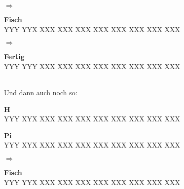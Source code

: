 $\Longrightarrow$
\parbox{0.2\linewidth}{
\begin{center}
  \textbf{Fisch} \\[1ex]
  \RubikCubeGreyAll%
	      {Y}{Y}{Y}
	      {Y}{Y}{X}%
		 {X}{X}{X}
		 {X}{X}{X}%
		 {X}{X}{X}
		 {X}{X}{X}%
		{X}{X}{X}
		{X}{X}{X}%
		{X}{X}{X}
		{X}{X}{X}%
\end{center}
}
$\Longrightarrow$
\parbox{0.2\linewidth}{
\begin{center}
  \textbf{Fertig} \\[1ex]
  \RubikCubeGreyAll%
	      {Y}{Y}{Y}
	      {Y}{Y}{Y}%
		 {X}{X}{X}
		 {X}{X}{X}%
		 {X}{X}{X}
		 {X}{X}{X}%
		{X}{X}{X}
		{X}{X}{X}%
		{X}{X}{X}
		{X}{X}{X}%
\end{center}
}\\[3em]
Und dann auch noch so:\\[1em]
\parbox{0.2\linewidth}{
  \begin{center}
    \textbf{H} \\[1ex]
    \RubikCubeGreyAll%
		{Y}{Y}{Y}
		{X}{Y}{X}%
		   {X}{X}{X}
		   {X}{X}{X}%
		   {X}{X}{X}
		   {X}{X}{X}%
		  {X}{X}{X}
		  {X}{X}{X}%
		  {X}{X}{X}
		  {X}{X}{X}%
  \end{center}
  \begin{center}
    \textbf{Pi} \\[1ex]
    \RubikCubeGreyAll%
		{Y}{Y}{Y}
		{X}{Y}{X}%
		   {X}{X}{X}
		   {X}{X}{X}%
		   {X}{X}{X}
		   {X}{X}{X}%
		  {X}{X}{X}
		  {X}{X}{X}%
		  {X}{X}{X}
		  {X}{X}{X}%
  \end{center}
}
$\Longrightarrow$
\parbox{0.2\linewidth}{
\begin{center}
  \textbf{Fisch} \\[1ex]
  \RubikCubeGreyAll%
	      {Y}{Y}{Y}
	      {Y}{Y}{X}%
		 {X}{X}{X}
		 {X}{X}{X}%
		 {X}{X}{X}
		 {X}{X}{X}%
		{X}{X}{X}
		{X}{X}{X}%
		{X}{X}{X}
		{X}{X}{X}%
\end{center}
}
